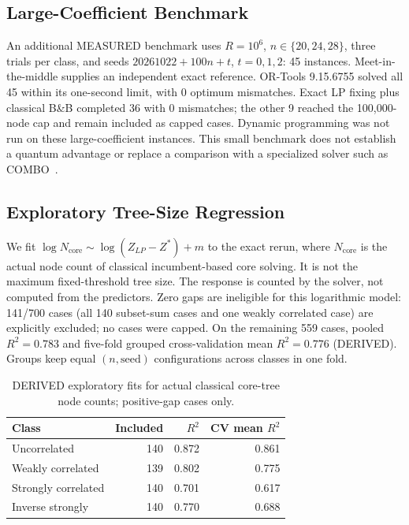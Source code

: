 \documentclass[pdflatex,sn-mathphys-num]{sn-jnl}
\begin{document}
\subsection{Large-Coefficient Benchmark}
An additional MEASURED benchmark uses $R=10^6$, $n\in\{20,24,28\}$, three trials per class, and seeds $20261022+100n+t$, $t=0,1,2$: 45 instances. Meet-in-the-middle supplies an independent exact reference. OR-Tools 9.15.6755 solved all 45 within its one-second limit, with 0 optimum mismatches. Exact LP fixing plus classical B\&B completed 36 with 0 mismatches; the other 9 reached the 100,000-node cap and remain included as capped cases. Dynamic programming was not run on these large-coefficient instances. This small benchmark does not establish a quantum advantage or replace a comparison with a specialized solver such as COMBO~\cite{martello1999combo}.

\subsection{Exploratory Tree-Size Regression}
We fit $\log N_{\mathrm{core}}\sim\log(Z_{LP}-Z^*)+m$ to the exact rerun, where $N_{\mathrm{core}}$ is the actual node count of classical incumbent-based core solving. It is not the maximum fixed-threshold tree size. The response is counted by the solver, not computed from the predictors. Zero gaps are ineligible for this logarithmic model: 141/700 cases (all 140 subset-sum cases and one weakly correlated case) are explicitly excluded; no cases were capped. On the remaining 559 cases, pooled $R^2=0.783$ and five-fold grouped cross-validation mean $R^2=0.776$ (DERIVED). Groups keep equal $(n,\mathrm{seed})$ configurations across classes in one fold.

\begin{table}[t]
\caption{DERIVED exploratory fits for actual classical core-tree node counts; positive-gap cases only.}
\label{tab:tlp_regression}
\centering
\begin{tabular}{lrrr}
\toprule
Class & Included & $R^2$ & CV mean $R^2$ \\
\midrule
Uncorrelated & 140 & 0.872 & 0.861 \\
Weakly correlated & 139 & 0.802 & 0.775 \\
Strongly correlated & 140 & 0.701 & 0.617 \\
Inverse strongly & 140 & 0.770 & 0.688 \\
\bottomrule
\end{tabular}
\end{table}
\end{document}
